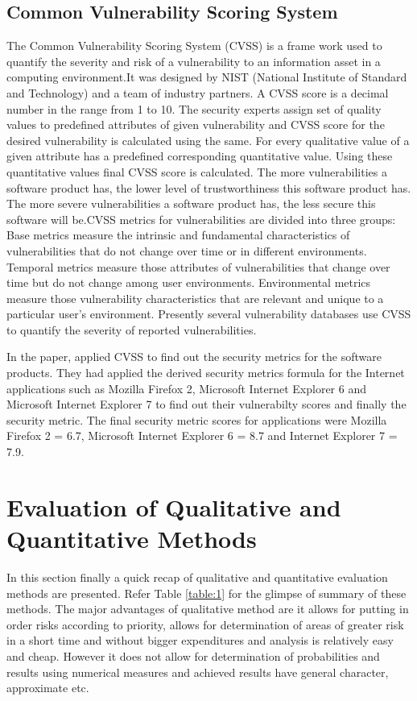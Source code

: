 \documentclass[pdftex,english,oribibl]{llncs}
\begin{document}
\subsection{Common Vulnerability Scoring System}
The Common Vulnerability Scoring System (CVSS) is a frame work used to quantify the severity and risk of a vulnerability to an information asset in a computing environment.It was designed by NIST (National Institute of Standard and Technology) and a team of industry partners. A CVSS score is a decimal number in the range from 1 to 10. The security experts assign set of quality values to predefined attributes of given vulnerability and CVSS score for the desired vulnerability is calculated using the same. For every qualitative value of a given attribute has a predefined corresponding quantitative value. Using these quantitative values final CVSS score is calculated. The more vulnerabilities a software product has, the lower level of trustworthiness this software product has. The more severe vulnerabilities a software product has, the less secure this software will be.CVSS metrics for vulnerabilities are divided into three groups: Base metrics measure the intrinsic and fundamental characteristics of vulnerabilities that do not change over time or in different environments. Temporal metrics measure those attributes of vulnerabilities that change over time but do not change among user environments. Environmental metrics measure those vulnerability characteristics that are relevant and unique to a particular user's environment. Presently several vulnerability databases use CVSS to quantify the severity of reported vulnerabilities.

In the paper, \cite{Wang:2009:SMS:1566445.1566509} applied CVSS to find out the security metrics for the software products. They had applied the derived security metrics formula for the Internet applications such as Mozilla Firefox 2, Microsoft Internet Explorer 6  and Microsoft Internet Explorer 7 to find out their vulnerabilty scores and finally the security metric. The final security metric scores for applications were Mozilla Firefox 2 = 6.7, Microsoft Internet Explorer 6 = 8.7 and Internet Explorer 7 = 7.9. 

\section{Evaluation of Qualitative and Quantitative Methods}
In this section finally a quick recap of qualitative and quantitative evaluation methods are presented. Refer Table \ref{table:1} for the glimpse of summary of these methods. The major advantages of qualitative method are it allows for putting in order risks according to priority, allows for determination of areas of greater risk in a short time and without bigger expenditures and analysis is relatively easy and cheap. However it does not allow for determination of probabilities and results using numerical measures and achieved results have general character, approximate etc.
\end{document}
